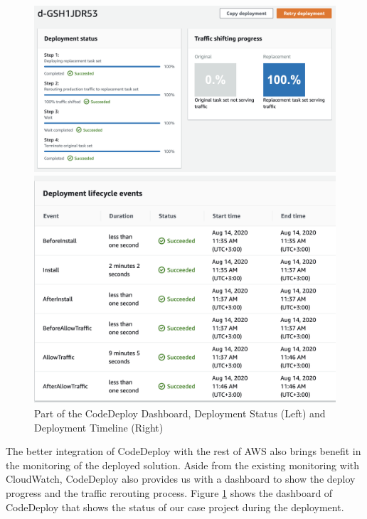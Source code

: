 \begin{figure}[!tbp]
     \centering
     \begin{minipage}[b]{0.50\textwidth}
       \includegraphics[width=\textwidth]{pics/codedeploy_steps.png}
     \end{minipage}
     \hfill
     \begin{minipage}[b]{0.48\textwidth}
       \includegraphics[width=\textwidth]{pics/codedeploy_time.png}
     \end{minipage}
     \caption{Part of the CodeDeploy Dashboard, Deployment Status (Left) and Deployment Timeline (Right)}
     \label{fig:codedeploy_steps}
\end{figure}
\par
The better integration of CodeDeploy with the rest of AWS also brings benefit in the monitoring of the deployed solution. Aside from the existing monitoring with CloudWatch, CodeDeploy also provides us with a dashboard to show the deploy progress and the traffic rerouting process. Figure \ref{fig:codedeploy_steps} shows the dashboard of CodeDeploy that shows the status of our case project during the deployment.
